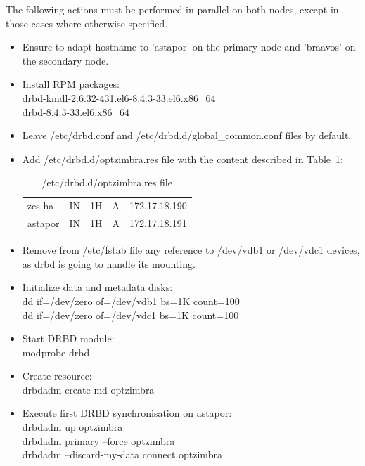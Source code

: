 \documentclass[a4paper, 12pt]{book}
\begin{document}
The following actions must be performed in parallel on both nodes, except in those cases where otherwise specified.

\begin{itemize}
	\item Ensure to adapt hostname to 'astapor' on the primary node and 'braavos' on the secondary node.
	
	\item Install RPM packages:\\
			drbd-kmdl-2.6.32-431.el6-8.4.3-33.el6.x86\_64\\
			drbd-8.4.3-33.el6.x86\_64
	
	\item Leave /etc/drbd.conf and /etc/drbd.d/global\_common.conf files by default.
	
	\item Add /etc/drbd.d/optzimbra.res file with the content described in Table~\ref{table:resource}:
	
\begin{table}
  \centering
  \begin{tabular}{ | l l l l l | }
    \hline
      zcs-ha          & IN & 1H & A     & 172.17.18.190\\
      astapor         & IN & 1H & A     & 172.17.18.191\\
    \hline
  \end{tabular}
\caption{/etc/drbd.d/optzimbra.res file}
\label{table:resource}
\end{table}
	
	\item Remove from /etc/fstab file any reference to /dev/vdb1 or /dev/vdc1 devices, as drbd is going to handle its mounting.
	
	\item Initialize data and metadata disks:\\
		dd if=/dev/zero of=/dev/vdb1 bs=1K count=100\\
		dd if=/dev/zero of=/dev/vdc1 bs=1K count=100
	
	\item Start DRBD module:\\
		modprobe drbd
	
	\item Create resource:\\
		drbdadm create-md optzimbra
	
	\item Execute first DRBD synchronisation on astapor:\\
		drbdadm up optzimbra\\
		drbdadm primary --force optzimbra\\
		drbdadm --discard-my-data connect optzimbra


\end{itemize}
\end{document}
